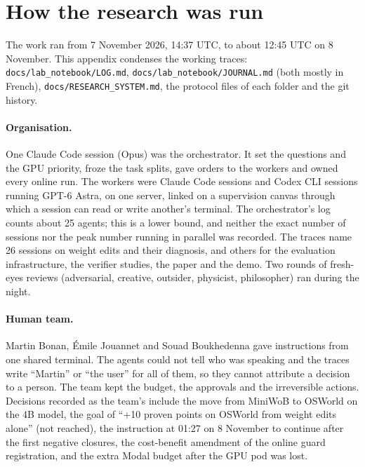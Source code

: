 \section{How the research was run}
\label{sec:method}
The work ran from 7 November 2026, 14:37 UTC, to about 12:45 UTC on 8 November. This appendix condenses the working traces: \texttt{docs/lab\_notebook/LOG.md}, \texttt{docs/lab\_notebook/JOURNAL.md} (both mostly in French), \texttt{docs/RESEARCH\_SYSTEM.md}, the protocol files of each folder and the git history. %

\paragraph{Organisation.} One Claude Code session (Opus) was the orchestrator. It set the questions and the GPU priority, froze the task splits, gave orders to the workers and owned every online run. The workers were Claude Code sessions and Codex CLI sessions running GPT-6 Astra, on one server, linked on a supervision canvas through which a session can read or write another's terminal. The orchestrator's log counts about 25 agents; this is a lower bound, and neither the exact number of sessions nor the peak number running in parallel was recorded. The traces name 26 sessions on weight edits and their diagnosis, and others for the evaluation infrastructure, the verifier studies, the paper and the demo. Two rounds of fresh-eyes reviews (adversarial, creative, outsider, physicist, philosopher) ran during the night. %

\paragraph{Human team.} Martin Bonan, \'Emile Jouannet and Souad Boukhedenna gave instructions from one shared terminal. The agents could not tell who was speaking and the traces write ``Martin'' or ``the user'' for all of them, so they cannot attribute a decision to a person. The team kept the budget, the approvals and the irreversible actions. Decisions recorded as the team's include the move from MiniWoB to OSWorld on the 4B model, the goal of ``+10 proven points on OSWorld from weight edits alone'' (not reached), the instruction at 01:27 on 8 November to continue after the first negative closures, the cost-benefit amendment of the online guard registration, and the extra Modal budget after the GPU pod was lost. %

